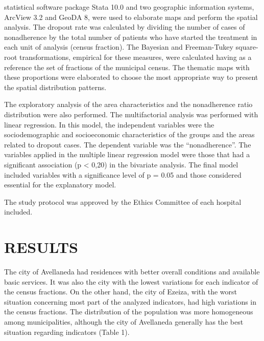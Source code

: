 \begin{multicols}{2}
statistical software package Stata 10.\allowbreak{}0 and two geographic information systems,\allowbreak{} ArcView 3.\allowbreak{}2 and GeoDA 8,\allowbreak{} were used to elaborate maps and perform the spatial analysis.\allowbreak{} The dropout rate was calculated by dividing the number of cases of nonadherence by the total number of patients who have started the treatment in each unit of analysis (\allowbreak{}census fraction)\allowbreak{}.\allowbreak{} The Bayesian and Freeman-\allowbreak{}Tukey square-\allowbreak{}root transformations,\allowbreak{} empirical for these measures,\allowbreak{} were calculated having as a reference the set of fractions of the municipal census.\allowbreak{} The thematic maps with these proportions were elaborated to choose the most appropriate way to present the spatial distribution patterns.\allowbreak{}\par{}The exploratory analysis of the area characteristics and the nonadherence ratio distribution were also performed.\allowbreak{} The multifactorial analysis was performed with linear regression.\allowbreak{} In this model,\allowbreak{} the independent variables were the sociodemographic and socioeconomic characteristics of the groups and the areas related to dropout cases.\allowbreak{} The dependent variable was the “nonadherence”.\allowbreak{} The variables applied in the multiple linear regression model were those that had a significant association (\allowbreak{}p < 0,\allowbreak{}20)\allowbreak{} in the bivariate analysis.\allowbreak{} The final model included variables with a significance level of p = 0.\allowbreak{}05 and those considered essential for the explanatory model.\allowbreak{}\par{}The study protocol was approved by the Ethics Committee of each hospital included.\allowbreak{}
\section*{RESULTS}
\par{}The city of Avellaneda had residences with better overall conditions and available basic services.\allowbreak{} It was also the city with the lowest variations for each indicator of the census fractions.\allowbreak{} On the other hand,\allowbreak{} the city of Ezeiza,\allowbreak{} with the worst situation concerning most part of the analyzed indicators,\allowbreak{} had high variations in the census fractions.\allowbreak{} The distribution of the population was more homogeneous among municipalities,\allowbreak{} although the city of Avellaneda generally has the best situation regarding indicators (\allowbreak{}Table 1)\allowbreak{}.\allowbreak{}\par{}\end{multicols}
